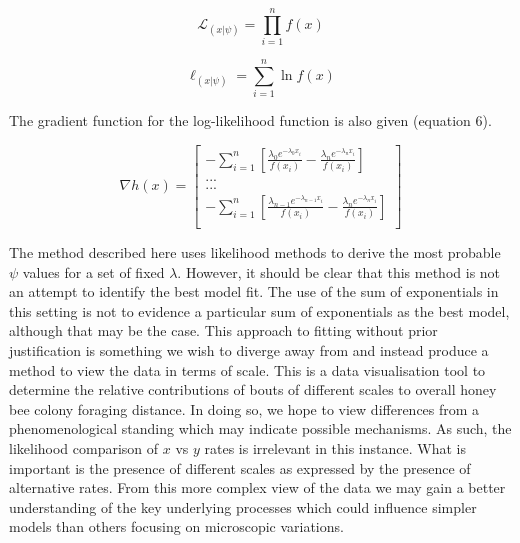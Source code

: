 \documentclass[11pt,usenames,dvipsnames]{article}
\newcommand{\Lagr}{\mathcal{L}}
\begin{document}
\begin{equation}
\Lagr_{(x|\psi)} = \prod_{i=1}^{n} f(x)
\end{equation} 

\begin{equation}
\ell_{(x|\psi)} = \sum_{i=1}^{n} \ln f(x)
\end{equation} 

The gradient function for the log-likelihood function is also given (equation 6).

\begin{equation}
\nabla h(x) = \begin{bmatrix} -\sum_{i=1}^{n} [\frac{\lambda_0 e^{-\lambda_0 x_i}}{f(x_i)} - \frac{\lambda_n e^{-\lambda_n x_i}}{f(x_i)}] \\
... \\
... \\
-\sum_{i=1}^{n} [\frac{\lambda_{n-1} e^{-\lambda_{n-1} x_i}}{f(x_i)} - \frac{\lambda_n e^{-\lambda_n x_i}}{f(x_i)}] \\
\end{bmatrix}
\end{equation}

The method described here uses likelihood methods to derive the most probable $\psi$ values for a set of fixed $\lambda$. However, it should be clear that this method is not an attempt to identify the best model fit. The use of the sum of exponentials in this setting is not to evidence a particular sum of exponentials as the best model, although that may be the case. This approach to fitting without prior justification is something we wish to diverge away from and instead produce a method to view the data in terms of scale. This is a data visualisation tool to determine the relative contributions of bouts of different scales to overall honey bee colony foraging distance. In doing so, we hope to view differences from a phenomenological standing which may indicate possible mechanisms. As such, the likelihood comparison of $x$ vs $y$ rates is irrelevant in this instance. What is important is the presence of different scales as expressed by the presence of alternative rates. From this more complex view of the data we may gain a better understanding of the key underlying processes which could influence simpler models than others focusing on microscopic variations. 
\end{document}
